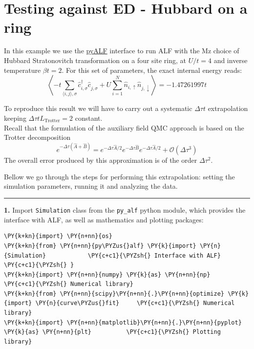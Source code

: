     
    

    
    \hypertarget{testing-against-ed---hubbard-on-a-ring}{%
\section{Testing against ED - Hubbard on a
ring}\label{testing-against-ed---hubbard-on-a-ring}}

    In this example we use the
\href{https://git.physik.uni-wuerzburg.de/ALF/pyALF/-/tree/ALF-2.0}{pyALF}
interface to run ALF with the Mz choice of Hubbard Stratonovitch
transformation on a four site ring, at \(U/t=4\) and inverse temperature
\(\beta t = 2\). For this set of parameters, the exact internal energy
reads:\\
\[
 \left\langle -t \sum_{\langle i,j\rangle, \sigma} \hat{c}_{i,\sigma}^{\dagger} \hat{c}_{j,\sigma}^{\phantom\dagger}   +  U  \sum_{i=1}^{N} \hat{n}_{i,\uparrow}\hat{n}_{j,\downarrow}  \right\rangle  =   -1.47261997 t 
\]

To reproduce this result we will have to carry out a systematic
\(\Delta \tau t\) extrapolation keeping
\(\Delta \tau t L_\text{Trotter} = 2\) constant.\\
Recall that the formulation of the auxiliary field QMC approach is based
on the Trotter decomposition \[
e^{ -\Delta \tau \left( \hat{A} + \hat{B} \right) }  =  e^{ -\Delta \tau \hat{A}/2}  e^{ -\Delta \tau  \hat{B}  }   e^{ -\Delta \tau \hat{A}/2}  +  \mathcal{O} \left (\Delta  \tau^3\right)
\] The overall error produced by this approximation is of the order
\(\Delta \tau^2\).

Bellow we go through the steps for performing this extrapolation:
setting the simulation parameters, running it and analyzing the data.

\begin{center}\rule{0.5\linewidth}{\linethickness}\end{center}

\textbf{1.} Import \texttt{Simulation} class from the \texttt{py\_alf}
python module, which provides the interface with ALF, as well as
mathematics and plotting packages:

    \begin{tcolorbox}[breakable, size=fbox, boxrule=1pt, pad at break*=1mm,colback=cellbackground, colframe=cellborder]
\begin{Verbatim}[commandchars=\\\{\}]
\PY{k+kn}{import} \PY{n+nn}{os}
\PY{k+kn}{from} \PY{n+nn}{py\PYZus{}alf} \PY{k}{import} \PY{n}{Simulation}            \PY{c+c1}{\PYZsh{} Interface with ALF}
\PY{c+c1}{\PYZsh{} }
\PY{k+kn}{import} \PY{n+nn}{numpy} \PY{k}{as} \PY{n+nn}{np}                       \PY{c+c1}{\PYZsh{} Numerical library}
\PY{k+kn}{from} \PY{n+nn}{scipy}\PY{n+nn}{.}\PY{n+nn}{optimize} \PY{k}{import} \PY{n}{curve\PYZus{}fit}     \PY{c+c1}{\PYZsh{} Numerical library}
\PY{k+kn}{import} \PY{n+nn}{matplotlib}\PY{n+nn}{.}\PY{n+nn}{pyplot} \PY{k}{as} \PY{n+nn}{plt}          \PY{c+c1}{\PYZsh{} Plotting library}
\end{Verbatim}
\end{tcolorbox}

